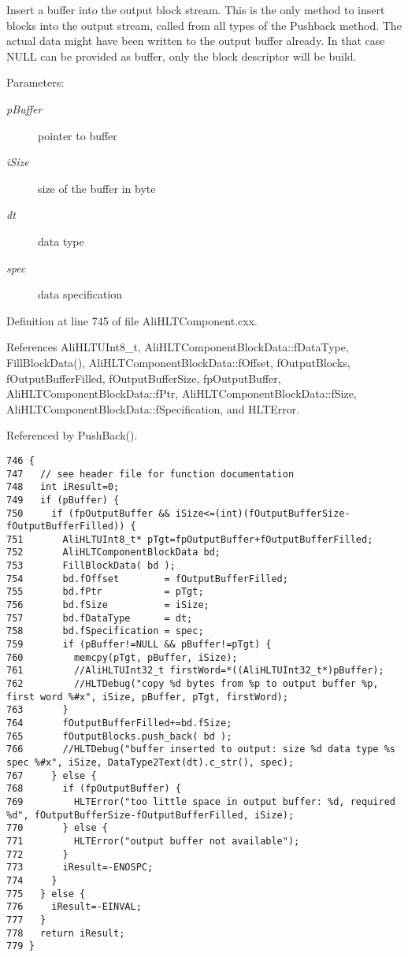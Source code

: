 Insert a buffer into the output block stream. This is the only method to insert blocks into the output stream, called from all types of the Pushback method. The actual data might have been written to the output buffer already. In that case NULL can be provided as buffer, only the block descriptor will be build. \begin{Desc}
\item[Parameters:]
\begin{description}
\item[{\em p\-Buffer}]pointer to buffer \item[{\em i\-Size}]size of the buffer in byte \item[{\em dt}]data type \item[{\em spec}]data specification \end{description}
\end{Desc}


Definition at line 745 of file Ali\-HLTComponent.cxx.

References Ali\-HLTUInt8\_\-t, Ali\-HLTComponent\-Block\-Data::f\-Data\-Type, Fill\-Block\-Data(), Ali\-HLTComponent\-Block\-Data::f\-Offset, f\-Output\-Blocks, f\-Output\-Buffer\-Filled, f\-Output\-Buffer\-Size, fp\-Output\-Buffer, Ali\-HLTComponent\-Block\-Data::f\-Ptr, Ali\-HLTComponent\-Block\-Data::f\-Size, Ali\-HLTComponent\-Block\-Data::f\-Specification, and HLTError.

Referenced by Push\-Back().

\footnotesize\begin{verbatim}746 {
747   // see header file for function documentation
748   int iResult=0;
749   if (pBuffer) {
750     if (fpOutputBuffer && iSize<=(int)(fOutputBufferSize-fOutputBufferFilled)) {
751       AliHLTUInt8_t* pTgt=fpOutputBuffer+fOutputBufferFilled;
752       AliHLTComponentBlockData bd;
753       FillBlockData( bd );
754       bd.fOffset        = fOutputBufferFilled;
755       bd.fPtr           = pTgt;
756       bd.fSize          = iSize;
757       bd.fDataType      = dt;
758       bd.fSpecification = spec;
759       if (pBuffer!=NULL && pBuffer!=pTgt) {
760         memcpy(pTgt, pBuffer, iSize);
761         //AliHLTUInt32_t firstWord=*((AliHLTUInt32_t*)pBuffer); 
762         //HLTDebug("copy %d bytes from %p to output buffer %p, first word %#x", iSize, pBuffer, pTgt, firstWord);
763       }
764       fOutputBufferFilled+=bd.fSize;
765       fOutputBlocks.push_back( bd );
766       //HLTDebug("buffer inserted to output: size %d data type %s spec %#x", iSize, DataType2Text(dt).c_str(), spec);
767     } else {
768       if (fpOutputBuffer) {
769         HLTError("too little space in output buffer: %d, required %d", fOutputBufferSize-fOutputBufferFilled, iSize);
770       } else {
771         HLTError("output buffer not available");
772       }
773       iResult=-ENOSPC;
774     }
775   } else {
776     iResult=-EINVAL;
777   }
778   return iResult;
779 }
\end{verbatim}\normalsize 


